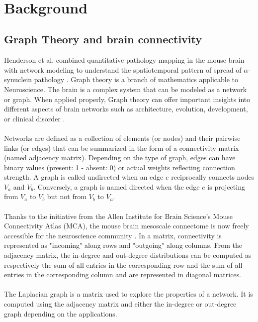 \\

\section{Background}
\subsection{Graph Theory and brain connectivity}
Henderson et al. combined quantitative pathology mapping in the mouse brain with network modeling to understand the spatiotemporal pattern of spread of  $\alpha$-synuclein pathology \cite{Henderson_2019}. Graph theory is a branch of mathematics applicable to Neuroscience. The brain is a complex system that can be modeled as a network or graph. When applied properly, Graph theory can offer important insights into different aspects of brain networks such as architecture, evolution, development, or clinical disorder \cite{Sporns_2018}.\\
\\
Networks are defined as a collection of elements (or nodes) and their pairwise links (or edges) that can be summarized in the form of a connectivity matrix (named adjacency matrix). Depending on the type of graph, edges can have binary values (present: 1 - absent: 0) or actual weights reflecting connection strength. A graph is called undirected when an edge $e$ reciprocally connects nodes $V_{a}$ and $V_{b}$. Conversely, a graph is named directed when the edge $e$ is projecting from $V_{a}$ to $V_{b}$ but not from $V_{b}$ to $V_{a}$.\\
\\
Thanks to the initiative from the Allen Institute for Brain Science's Mouse Connectivity Atlas (MCA), the mouse brain mesoscale connectome is now freely accessible for the neuroscience community \cite{Oh_2014}. In a matrix, connectivity is represented as "incoming" along  rows and "outgoing" along  columns. From the adjacency matrix, the in-degree and out-degree distributions can be computed as respectively the sum of all entries in the corresponding row and the sum of all entries in the corresponding column and are represented in diagonal matrices.\\
\\
The Laplacian graph is a matrix used to explore the properties of a network. It is computed using the adjacency matrix and either the in-degree or out-degree graph depending on the applications.

